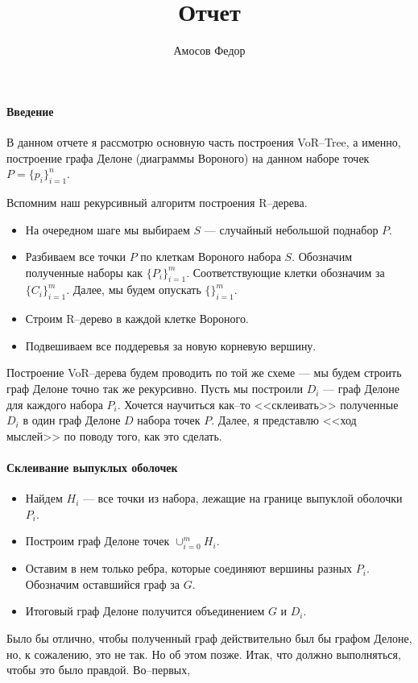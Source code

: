 \documentclass{article}
\title{\bf Отчет \No 4}
\author{Амосов Федор}
\begin{document}
	\maketitle
	
	\paragraph{Введение}
        В данном отчете я рассмотрю основную часть построения VoR--Tree, а именно, построение графа Делоне (диаграммы Вороного) на данном наборе точек $P = \{p_i\}_{i = 1}^n$. 
    
        Вспомним наш рекурсивный алгоритм построения R--дерева. 
        \begin{itemize}
            \item На очередном шаге мы выбираем $S$ --- случайный небольшой поднабор $P$.
            \item Разбиваем все точки $P$ по клеткам Вороного набора $S$. Обозначим полученные наборы как $\{P_i\}_{i = 1}^m$. Соответствующие клетки обозначим за $\{C_i\}_{i = 1}^m$. Далее, мы будем опускать $\{\}_{i = 1}^m$.
            \item Строим R--дерево в каждой клетке Вороного.
            \item Подвешиваем все поддеревья за новую корневую вершину.
        \end{itemize}    
    
        Построение VoR--дерева будем проводить по той же схеме --- мы будем строить граф Делоне точно так же рекурсивно. Пусть мы построили $D_i$ --- граф Делоне для каждого набора $P_i$. Хочется научиться как--то <<склеивать>> полученные $D_i$ в один граф Делоне $D$ набора точек $P$. Далее, я представлю <<ход мыслей>> по поводу того, как это сделать.
    
    \paragraph{Склеивание выпуклых оболочек\\}
        \begin{itemize}
            \item Найдем $H_i$ --- все точки из набора, лежащие на границе выпуклой оболочки $P_i$.
            \item Построим граф Делоне точек $\cup_{i = 0}^m H_i$.
            \item Оставим в нем только ребра, которые соединяют вершины разных $P_i$. Обозначим оставшийся граф за $G$.
            \item Итоговый граф Делоне получится объединением $G$ и $D_i$.
        \end{itemize}
          Было бы отлично, чтобы полученный граф действительно был бы графом Делоне, но, к сожалению, это не так. Но об этом позже. Итак, что должно выполняться, чтобы это было правдой. Во--первых,
          
\end{document}
